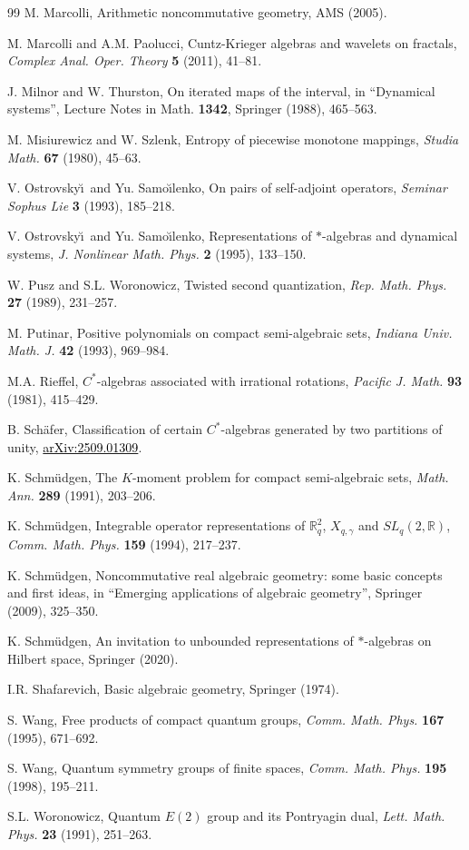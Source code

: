 \documentclass[11pt]{amsart}
\theoremstyle{definition}
\begin{document}
\begin{thebibliography}{99}
 M. Marcolli, Arithmetic noncommutative geometry, AMS (2005).

 M. Marcolli and A.M. Paolucci, Cuntz-Krieger algebras and wavelets on fractals, {\em Complex Anal. Oper. Theory} {\bf 5} (2011), 41--81.

 J. Milnor and W. Thurston, On iterated maps of the interval, in ``Dynamical systems'', Lecture Notes in Math. {\bf 1342}, Springer (1988), 465--563.

 M. Misiurewicz and W. Szlenk, Entropy of piecewise monotone mappings, {\em Studia Math.} {\bf 67} (1980), 45--63.

 V. Ostrovsky\u\i\ and Yu. Samo\u\i lenko, On pairs of self-adjoint operators, {\em Seminar Sophus Lie} {\bf 3} (1993), 185--218.

 V. Ostrovsky\u\i\ and Yu. Samo\u\i lenko, Representations of $*$-algebras and dynamical systems, {\em J. Nonlinear Math. Phys.} {\bf 2} (1995), 133--150.

 W. Pusz and S.L. Woronowicz, Twisted second quantization, {\em Rep. Math. Phys.} {\bf 27} (1989), 231--257.

 M. Putinar, Positive polynomials on compact semi-algebraic sets, {\em Indiana Univ. Math. J.} {\bf 42} (1993), 969--984.

 M.A. Rieffel, $C^*$-algebras associated with irrational rotations, {\em Pacific J. Math.} {\bf 93} (1981), 415--429.

 B. Sch\"afer, Classification of certain $C^*$-algebras generated by two partitions of unity, \href{https://arxiv.org/pdf/2509.01309}{\textcolor{black}{\mbox{arXiv:2509.01309}}}.

 K. Schm\"udgen, The $K$-moment problem for compact semi-algebraic sets, {\em Math. Ann.} {\bf 289} (1991), 203--206.

 K. Schm\"udgen, Integrable operator representations of $\mathbb R_q^2$, $X_{q,\gamma}$ and $SL_q(2,\mathbb R)$, {\em Comm. Math. Phys.} {\bf 159} (1994), 217--237.

 K. Schm\"udgen, Noncommutative real algebraic geometry: some basic concepts and first ideas, in ``Emerging applications of algebraic geometry'', Springer (2009), 325--350.

 K. Schm\"udgen, An invitation to unbounded representations of $*$-algebras on Hilbert space, Springer (2020).

 I.R. Shafarevich, Basic algebraic geometry, Springer (1974).

 S. Wang, Free products of compact quantum groups, {\em Comm. Math. Phys.} {\bf 167} (1995), 671--692.

 S. Wang, Quantum symmetry groups of finite spaces, {\em Comm. Math. Phys.} {\bf 195} (1998), 195--211.

 S.L. Woronowicz, Quantum $E(2)$ group and its Pontryagin dual, {\em Lett. Math. Phys.} {\bf 23} (1991), 251--263.

\end{thebibliography}
\end{document}
